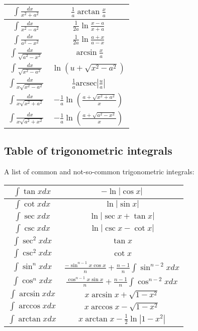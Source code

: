       \begin{tabular}{|c|c|}
        \hline
        $\int \frac{dx}{x^2 + a^2}$ & $\frac{1}{a} \arctan \frac{x}{a}$ \\ \hline
        $\int \frac{dx}{x^2 - a^2}$ & $\frac{1}{2a} \ln \frac{x - a}{x + a}$ \\ \hline
        $\int \frac{dx}{a^2 - x^2}$ & $\frac{1}{2a} \ln \frac{a + x}{a - x}$ \\ \hline
        $\int \frac{dx}{\sqrt{a^2 - x^2}}$ & $\arcsin \frac{x}{a}$ \\ \hline
        $\int \frac{dx}{\sqrt{x^2 - a^2}}$ & $\ln \left(u + \sqrt{x^2 - a^2}\right)$ \\ \hline
        $\int \frac{dx}{x \sqrt{x^2 - a^2}}$ & $\frac{1}{a} \text{arcsec} \left| \frac{u}{a} \right|$ \\ \hline
        $\int \frac{dx}{x \sqrt{x^2 + a^2}}$ & $-\frac{1}{a} \ln \left( \frac{a + \sqrt{x^2 + a^2}}{x} \right)$ \\ \hline
        $\int \frac{dx}{x \sqrt{a^2 + x^2}}$ & $-\frac{1}{a} \ln \left( \frac{a + \sqrt{a^2 - x^2}}{x} \right)$ \\ \hline
      \end{tabular}


\subsection{Table of trigonometric integrals}
      A list of common and not-so-common trigonometric integrals:

      \begin{tabular}{|c|c|}
        \hline
        $\int \tan x dx$ & $-\ln |\cos x|$ \\ \hline
        $\int \cot x dx$ & $\ln |\sin x|$ \\ \hline
        $\int \sec x dx$ & $\ln |\sec x + \tan x|$ \\ \hline
        $\int \csc x dx$ & $\ln |\csc x - \cot x|$ \\ \hline
        $\int \sec^2 x dx$ & $\tan x$ \\ \hline
        $\int \csc^2 x dx$ & $\cot x$ \\ \hline
        $\int \sin^n x dx$ & $\frac{-\sin^{n-1} x \cos x}{n} + \frac{n-1}{n}\int \sin^{n-2}x dx$ \\ \hline
        $\int \cos^n x dx$ & $\frac{\cos^{n-1} x \sin x}{n} + \frac{n-1}{n}\int \cos^{n-2}x dx$ \\ \hline
        $\int \arcsin x dx$ & $x \arcsin x + \sqrt{1 - x^2}$ \\ \hline
        $\int \arccos x dx$ & $x \arccos x - \sqrt{1 - x^2}$ \\ \hline
        $\int \arctan x dx$ & $x \arctan x - \frac{1}{2} \ln |1 - x^2|$ \\ \hline
      \end{tabular}


